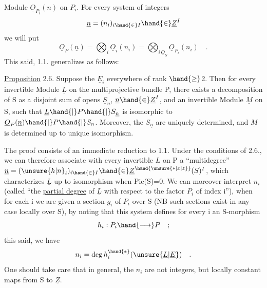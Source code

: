 
 Module $\underline{O}_{P_i}(n)$ on $P_i$. For every system of integers
\[ \underline{n} = (n_i)_{i \hand{\in} I} \hand{\in} \underline{Z}^I \]
we  will put
\[ \underline{O}_P(\underline{n}) = \bigotimes_i \underline{O}_i(n_i) = \bigotimes_{i\,\underline{O}_S} \underline{O}_{P_i}(n_i) \quad . \]
This said, 1.1. generalizes as follows:

\uline{Proposition} 2.6. Suppose the $\underline{E}_i$ everywhere of rank $\hand{\geq}$2. Then for every
invertible Module $\underline{L}$ on the multiprojective bundle P, there exists a
 decomposition of S as a disjoint sum of opens $\underline{S}_{\underline{n}}$, $\underline{n} \hand{\in} \underline{Z}^I$,
and  an invertible Module $\underline{M}$ on S, such that $\underline{L}\hand{|}P\hand{|}S_{\underline{n}}$
is isomorphic to $\underline{O}_P(\underline{n})\hand{|}P\hand{|}S_n$. Moreover, the $S_{\underline{n}}$ are uniquely
determined, and  $\underline{M}$ is determined up to unique isomorphism.

 The proof  consists of an immediate reduction to 1.1.
Under the conditions of 2.6., we can therefore associate with every invertible $\underline{L}$
on P a ``multidegree'' $\underline{n} = (\unsure{h|n}_i)_{i \hand{\in} I} \hand{\in} \underline{Z}^{\hand{\unsure{*|x|z}}}(S)^I$, which characterizes $\underline{L}$ up to isomorphism
when Pic(S)=0. We can moreover interpret $n_i$ (called
``the \uline{partial degree} of $\underline{L}$ with respect to the factor $P_i$ of index i''), when
for each i we are given a section $g_i$ of $P_i$ over S (NB such sections
exist in any case locally over S), by noting that this system defines
for every i an S-morphism 
\[ h_i : P_i \hand{\longrightarrow} P \quad ; \]
this said, we have
\[ n_i = \deg h_i^{\hand{*}}(\unsure{\underline{L}|\underline{E}}) \quad . \]
One should take care that in general, the $n_i$ are not integers, but locally constant
maps from S to $\underline{Z}$.

